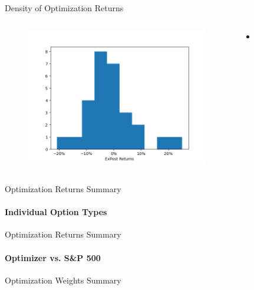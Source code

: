 \documentclass[9pt]{beamer}
\begin{document}
\begin{frame}{Density of Optimization Returns}
\begin{columns}
\begin{figure}
    \includegraphics[width=8cm]{Fig4_OOPSRet.png}
\end{figure}
\begin{center}
\begin{itemize}
    \item  
\end{itemize}
\end{center}
\end{columns}
\end{frame}

\begin{frame}{Optimization Returns Summary}
\framesubtitle{Individual Option Types}
\begin{center}
	
\end{center}
\end{frame}

\begin{frame}{Optimization Returns Summary}
\framesubtitle{Optimizer vs. S\&P 500}
\begin{center}
	
\end{center}
\end{frame}

\begin{frame}{Optimization Weights Summary}
\begin{center}
	
\end{center}
\end{frame}

\end{document}
